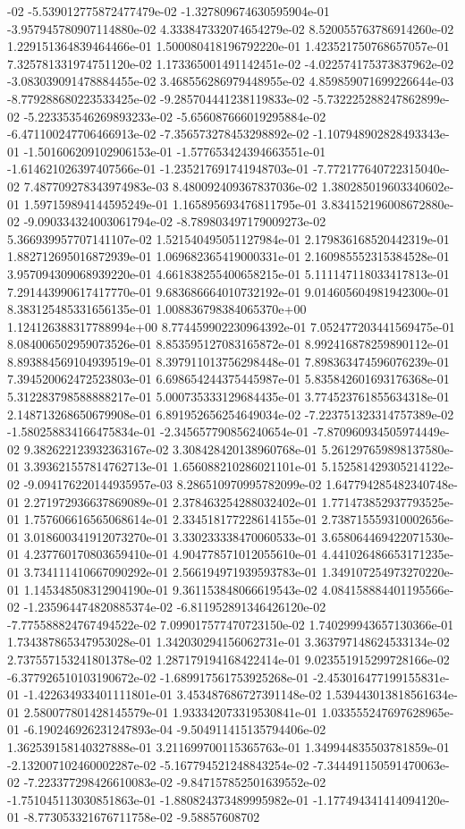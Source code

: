 -02	-5.539012775872477479e-02	-1.327809674630595904e-01	-3.957945780907114880e-02	4.333847332074654279e-02	8.520055763786914260e-02	1.229151364839464466e-01	1.500080418196792220e-01	1.423521750768657057e-01	7.325781331974751120e-02	1.173365001491142451e-02	-4.022574175373837962e-02	-3.083039091478884455e-02	3.468556286979448955e-02	4.859859071699226644e-03	-8.779288680223533425e-02	-9.285704441238119833e-02	-5.732225288247862899e-02	-5.223353546269893233e-02	-5.656087666019295884e-02	-6.471100247706466913e-02	-7.356573278453298892e-02	-1.107948902828493343e-01	-1.501606209102906153e-01	-1.577653424394663551e-01	-1.614621026397407566e-01	-1.235217691741948703e-01	-7.772177640722315040e-02	7.487709278343974983e-03	8.480092409367837036e-02	1.380285019603340602e-01	1.597159894144595249e-01	1.165895693476811795e-01	3.834152196008672880e-02	-9.090334324003061794e-02	-8.789803497179009273e-02	5.366939957707141107e-02	1.521540495051127984e-01	2.179836168520442319e-01	1.882712695016872939e-01	1.069682365419000331e-01	2.160985552315384528e-01	3.957094309068939220e-01	4.661838255400658215e-01	5.111147118033417813e-01	7.291443990617417770e-01	9.683686664010732192e-01	9.014605604981942300e-01	8.383125485331656135e-01	1.008836798384065370e+00	1.124126388317788994e+00	8.774459902230964392e-01	7.052477203441569475e-01	8.084006502959073526e-01	8.853595127083165872e-01	8.992416878259890112e-01	8.893884569104939519e-01	8.397911013756298448e-01	7.898363474596076239e-01	7.394520062472523803e-01	6.698654244375445987e-01	5.835842601693176368e-01	5.312283798588888217e-01	5.000735333129684435e-01	3.774523761855634318e-01	2.148713268650679908e-01	6.891952656254649034e-02	-7.223751323314757389e-02	-1.580258834166475834e-01	-2.345657790856240654e-01	-7.870960934505974449e-02	9.382622123932363167e-02	3.308428420138960768e-01	5.261297659898137580e-01	3.393621557814762713e-01	1.656088210286021101e-01	5.152581429305214122e-02	-9.094176220144935957e-03	8.286510970995782099e-02	1.647794285482340748e-01	2.271972936637869089e-01	2.378463254288032402e-01	1.771473852937793525e-01	1.757606616565068614e-01	2.334518177228614155e-01	2.738715559310002656e-01	3.018600341912073270e-01	3.330233338470060533e-01	3.658064469422071530e-01	4.237760170803659410e-01	4.904778571012055610e-01	4.441026486653171235e-01	3.734111410667090292e-01	2.566194971939593783e-01	1.349107254973270220e-01	1.145348508312904190e-01	9.361153848066619543e-02	4.084158884401195566e-02	-1.235964474820885374e-02	-6.811952891346426120e-02	-7.775588824767494522e-02	7.099017577470723150e-02	1.740299943657130366e-01	1.734387865347953028e-01	1.342030294156062731e-01	3.363797148624533134e-02	2.737557153241801378e-02	1.287179194168422414e-01	9.023551915299728166e-02	-6.377926510103190672e-02	-1.689917561753925268e-01	-2.453016477199155831e-01	-1.422634933401111801e-01	3.453487686727391148e-02	1.539443013818561634e-01	2.580077801428145579e-01	1.933342073319530841e-01	1.033555247697628965e-01	-6.190246926231247893e-04	-9.504911415135794406e-02	1.362539158140327888e-01	3.211699700115365763e-01	1.349944835503781859e-01	-2.132007102460002287e-02	-5.167794521248843254e-02	-7.344491150591470063e-02	-7.223377298426610083e-02	-9.847157852501639552e-02	-1.751045113030851863e-01	-1.880824373489995982e-01	-1.177494341414094120e-01	-8.773053321676711758e-02	-9.58857608702